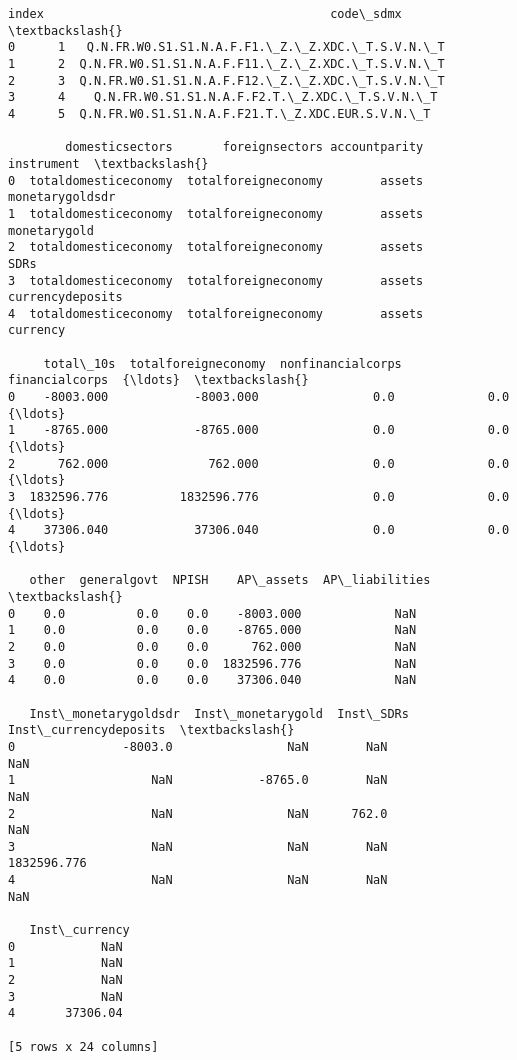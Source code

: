 \documentclass[11pt]{article}
\begin{document}
    \begin{Verbatim}[commandchars=\\\{\}]
   index                                        code\_sdmx  \textbackslash{}
0      1   Q.N.FR.W0.S1.S1.N.A.F.F1.\_Z.\_Z.XDC.\_T.S.V.N.\_T
1      2  Q.N.FR.W0.S1.S1.N.A.F.F11.\_Z.\_Z.XDC.\_T.S.V.N.\_T
2      3  Q.N.FR.W0.S1.S1.N.A.F.F12.\_Z.\_Z.XDC.\_T.S.V.N.\_T
3      4    Q.N.FR.W0.S1.S1.N.A.F.F2.T.\_Z.XDC.\_T.S.V.N.\_T
4      5  Q.N.FR.W0.S1.S1.N.A.F.F21.T.\_Z.XDC.EUR.S.V.N.\_T

        domesticsectors       foreignsectors accountparity        instrument  \textbackslash{}
0  totaldomesticeconomy  totalforeigneconomy        assets   monetarygoldsdr
1  totaldomesticeconomy  totalforeigneconomy        assets      monetarygold
2  totaldomesticeconomy  totalforeigneconomy        assets              SDRs
3  totaldomesticeconomy  totalforeigneconomy        assets  currencydeposits
4  totaldomesticeconomy  totalforeigneconomy        assets          currency

     total\_10s  totalforeigneconomy  nonfinancialcorps  financialcorps  {\ldots}  \textbackslash{}
0    -8003.000            -8003.000                0.0             0.0  {\ldots}
1    -8765.000            -8765.000                0.0             0.0  {\ldots}
2      762.000              762.000                0.0             0.0  {\ldots}
3  1832596.776          1832596.776                0.0             0.0  {\ldots}
4    37306.040            37306.040                0.0             0.0  {\ldots}

   other  generalgovt  NPISH    AP\_assets  AP\_liabilities  \textbackslash{}
0    0.0          0.0    0.0    -8003.000             NaN
1    0.0          0.0    0.0    -8765.000             NaN
2    0.0          0.0    0.0      762.000             NaN
3    0.0          0.0    0.0  1832596.776             NaN
4    0.0          0.0    0.0    37306.040             NaN

   Inst\_monetarygoldsdr  Inst\_monetarygold  Inst\_SDRs  Inst\_currencydeposits  \textbackslash{}
0               -8003.0                NaN        NaN                    NaN
1                   NaN            -8765.0        NaN                    NaN
2                   NaN                NaN      762.0                    NaN
3                   NaN                NaN        NaN            1832596.776
4                   NaN                NaN        NaN                    NaN

   Inst\_currency
0            NaN
1            NaN
2            NaN
3            NaN
4       37306.04

[5 rows x 24 columns]
    \end{Verbatim}
\end{document}
